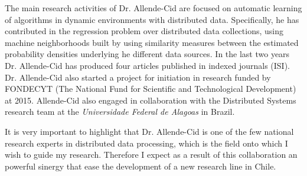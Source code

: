 \documentclass[10pt]{article}
\begin{document}
The main research activities of Dr. Allende-Cid are focused on automatic learning of algorithms in dynamic environments with distributed data. Specifically, he has contributed in the regression problem over distributed data collections, using machine neighborhoods built by using similarity measures between the estimated probability densities underlying he different data sources. In the last two years Dr. Allende-Cid has produced four articles published in indexed journals (ISI). Dr.
Allende-Cid also started a project for initiation in research funded by FONDECYT (The National Fund for Scientific and Technological Development) at 2015. Allende-Cid also engaged in collaboration with the Distributed Systems research team at the \textit{Universidade Federal de Alagoas} in Brazil.

It is very important to highlight that Dr. Allende-Cid is one of the few national research experts in distributed data processing, which is the field onto which I wish to guide my research. Therefore I expect as a result of this collaboration an powerful sinergy that ease the development of a new research line in Chile.
\end{document}
